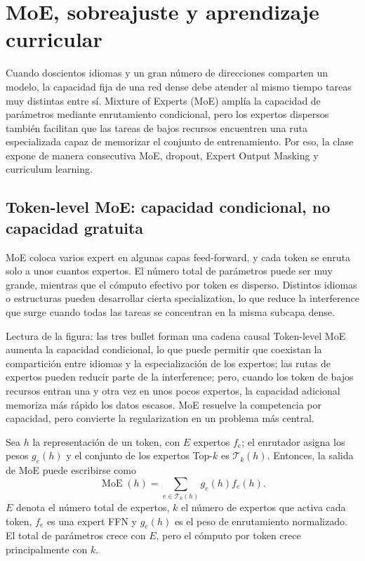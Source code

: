 \section{MoE, sobreajuste y aprendizaje curricular}

Cuando doscientos idiomas y un gran número de direcciones comparten un modelo, la capacidad fija de una red dense debe atender al mismo tiempo tareas muy distintas entre sí. Mixture of Experts (MoE) amplía la capacidad de parámetros mediante enrutamiento condicional, pero los expertos dispersos también facilitan que las tareas de bajos recursos encuentren una ruta especializada capaz de memorizar el conjunto de entrenamiento. Por eso, la clase expone de manera consecutiva MoE, dropout, Expert Output Masking y curriculum learning.

\subsection{Token-level MoE: capacidad condicional, no capacidad gratuita}

MoE coloca varios expert en algunas capas feed-forward, y cada token se enruta solo a unos cuantos expertos. El número total de parámetros puede ser muy grande, mientras que el cómputo efectivo por token es disperso. Distintos idiomas o estructuras pueden desarrollar cierta specialization, lo que reduce la interference que surge cuando todas las tareas se concentran en la misma subcapa dense.


\begin{knowledgebox}{Lectura de la figura: las tres bullet forman una cadena causal}
Token-level MoE aumenta la capacidad condicional, lo que puede permitir que coexistan la compartición entre idiomas y la especialización de los expertos; las rutas de expertos pueden reducir parte de la interference; pero, cuando los token de bajos recursos entran una y otra vez en unos pocos expertos, la capacidad adicional memoriza más rápido los datos escasos. MoE resuelve la competencia por capacidad, pero convierte la regularization en un problema más central.
\end{knowledgebox}

Sea $h$ la representación de un token, con $E$ expertos $f_e$; el enrutador asigna los pesos $g_e(h)$ y el conjunto de los expertos Top-$k$ es $\mathcal{T}_k(h)$. Entonces, la salida de MoE puede escribirse como
\[
\operatorname{MoE}(h)=\sum_{e\in\mathcal{T}_k(h)} g_e(h)f_e(h).
\]
$E$ denota el número total de expertos, $k$ el número de expertos que activa cada token, $f_e$ es una expert FFN y $g_e(h)$ es el peso de enrutamiento normalizado. El total de parámetros crece con $E$, pero el cómputo por token crece principalmente con $k$.

